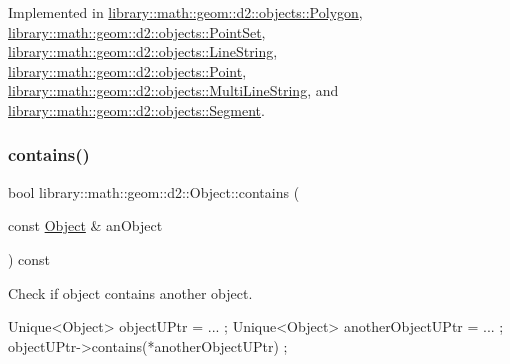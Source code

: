 Implemented in \hyperlink{classlibrary_1_1math_1_1geom_1_1d2_1_1objects_1_1_polygon_a15bbbe7e468a50d6059e2df946175e1c}{library\+::math\+::geom\+::d2\+::objects\+::\+Polygon}, \hyperlink{classlibrary_1_1math_1_1geom_1_1d2_1_1objects_1_1_point_set_ad867c4fb86734efe968a39c95eba53b3}{library\+::math\+::geom\+::d2\+::objects\+::\+Point\+Set}, \hyperlink{classlibrary_1_1math_1_1geom_1_1d2_1_1objects_1_1_line_string_a5b503802b279c6c305fed6a07a893ad2}{library\+::math\+::geom\+::d2\+::objects\+::\+Line\+String}, \hyperlink{classlibrary_1_1math_1_1geom_1_1d2_1_1objects_1_1_point_aa6b55bdbf5a0ce9ec8bc91ca79de3569}{library\+::math\+::geom\+::d2\+::objects\+::\+Point}, \hyperlink{classlibrary_1_1math_1_1geom_1_1d2_1_1objects_1_1_multi_line_string_a38054f0f0a2c198b5d3c76ef22562e30}{library\+::math\+::geom\+::d2\+::objects\+::\+Multi\+Line\+String}, and \hyperlink{classlibrary_1_1math_1_1geom_1_1d2_1_1objects_1_1_segment_a6149a3cf215b0b573d5bd4f25fad75e9}{library\+::math\+::geom\+::d2\+::objects\+::\+Segment}.

\mbox{\label{classlibrary_1_1math_1_1geom_1_1d2_1_1_object_a7bc14e621db51aec72eff0fa5da295ac}} 
\subsubsection{\texorpdfstring{contains()}{contains()}}
{\footnotesize\ttfamily bool library\+::math\+::geom\+::d2\+::\+Object\+::contains (\begin{DoxyParamCaption}\item[{const \hyperlink{classlibrary_1_1math_1_1geom_1_1d2_1_1_object}{Object} \&}]{an\+Object }\end{DoxyParamCaption}) const\hspace{0.3cm}{\ttfamily [virtual]}}



Check if object contains another object. 


\begin{DoxyCode}
Unique<Object> objectUPtr = ... ;
Unique<Object> anotherObjectUPtr = ... ;
objectUPtr->contains(*anotherObjectUPtr) ;
\end{DoxyCode}



